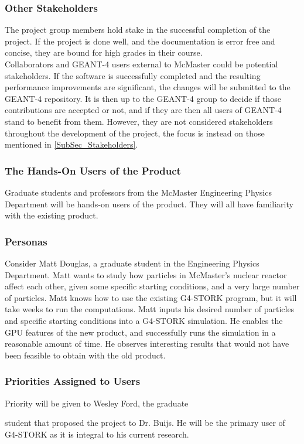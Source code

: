 \documentclass[12pt]{article}
\newcommand{\todo}[1]{\textcolor{red}{[TODO: #1]}} \else
\newcommand{\authornote}[3]{} \newcommand{\todo}[1]{} \fi
\newcommand{\ds}[1]{\authornote{blue}{DS}{#1}} %
\newcommand{\mmp}[1]{\authornote{green}{MP}{#1}}
\begin{document}
\subsubsection{Other Stakeholders}
The project group members hold stake in the successful completion of the project. If the project is done well, and the documentation is error free and concise, they are bound for high grades in their course.\\

Collaborators and GEANT-4 users external to McMaster could be potential stakeholders. If the software is successfully completed and the resulting performance improvements are significant, the changes will be submitted to the GEANT-4 repository. It is then up to the GEANT-4 group to decide if those contributions are accepted or not, and if they are then all users of GEANT-4 stand to benefit from them. However, they are not considered stakeholders throughout the development of the project, the focus is instead on those mentioned in \ref{SubSec_Stakeholders}.

\subsubsection{The Hands-On Users of the Product}
Graduate students and professors from the McMaster Engineering Physics Department will be hands-on users of the product. They will all have familiarity with the existing product. 

\subsubsection{Personas}
Consider Matt Douglas, a graduate student in the Engineering Physics Department. Matt wants to study how particles in McMaster's nuclear reactor affect each other, given some specific starting conditions, and a very large number of particles. Matt knows how to use the existing G4-STORK program, but it will take weeks to run the computations. Matt inputs his desired number of particles and specific starting conditions into a G4-STORK simulation. He enables the GPU features of the new product, and successfully runs the simulation in a reasonable amount of time. He observes interesting results that would not have been feasible to obtain with the old product.\\

\subsubsection{Priorities Assigned to Users}
Priority will be given to Wesley Ford, the graduate
\ds{``graduate"} \mmp{fixed}
student that proposed the project to Dr. Buijs. He will be the primary user of G4-STORK as it is integral to his current research.
\end{document}
